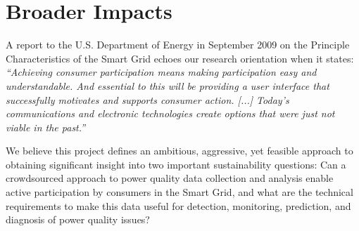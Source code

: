 
\section{Broader Impacts}
\label{sec:merit}



A report to the U.S. Department of Energy in September 2009 on the
Principle Characteristics of the Smart Grid echoes our research orientation
when it states: {\em ``Achieving consumer participation means
  making participation easy and understandable.  And essential to this will
  be providing a user interface that successfully motivates and supports
  consumer action. [...] Today's communications and electronic technologies
  create options that were just not viable in the past.''}
\cite{NETL:EnablesActiveParticipation}

We believe this project defines an ambitious, aggressive, yet feasible approach to obtaining significant insight into two important sustainability questions: Can a crowdsourced approach to power quality data collection and analysis enable active participation by consumers in the Smart Grid, and what are the technical requirements to make this data useful for detection, monitoring, prediction, and diagnosis of power quality issues?

